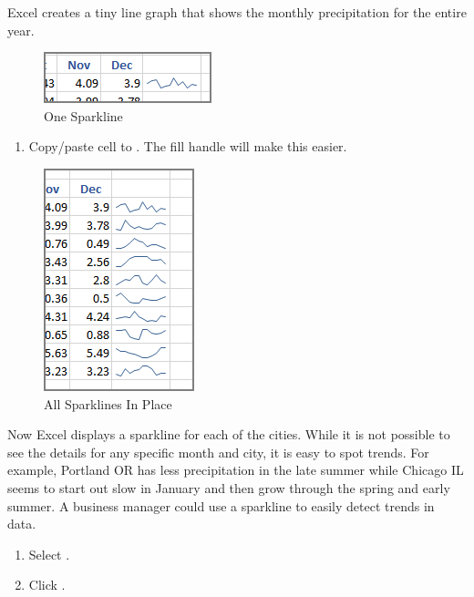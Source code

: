 Excel creates a tiny line graph that shows the monthly precipitation for the entire year. 

\begin{figure}[H]
	\centering
	\includegraphics[width=\maxwidth{.95\linewidth}]{gfx/ch08_fig03}
	\caption{One Sparkline}
	\label{08:fig03}
\end{figure}

\begin{enumerate}[resume]
	\item Copy/paste cell  to . The fill handle will make this easier. 
\end{enumerate}

\begin{figure}[H]
	\centering
	\includegraphics[width=\maxwidth{.95\linewidth}]{gfx/ch08_fig04}
	\caption{All Sparklines In Place}
	\label{08:fig04}
\end{figure}

Now Excel displays a sparkline for each of the cities. While it is not possible to see the details for any specific month and city, it is easy to spot trends. For example, Portland OR has less precipitation in the late summer while Chicago IL seems to start out slow in January and then grow through the spring and early summer. A business manager could use a sparkline to easily detect trends in data.

\begin{enumerate}[resume]
	\item Select .
	\item Click .
\end{enumerate}


